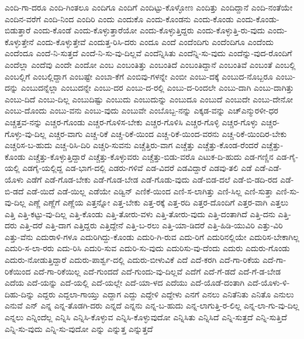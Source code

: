 {ಎಂದಿ-ಗಾ-ದರೂ
ಎಂದಿ-ಗಿಂತಲೂ
ಎಂದಿಗೂ
ಎಂದಿಗೆ
ಎಂದಿಟ್ಟು-ಕೊಳ್ಳೋಣ
ಎಂದಿತ್ತು
ಎಂದಿದ್ದಾನೆ
ಎಂದಿ-ನಂತೆಯೇ
ಎಂದಿನ-ವರೆಗೆ
ಎಂದಿ-ನಿಂದ
ಎಂದಿರಿ
ಎಂದು
ಎಂದುಕೊ
ಎಂದು-ಕೊಂಡನು
ಎಂದು-ಕೊಂಡು
ಎಂದು-ಕೊಂಡು-ಬಿಡುತ್ತಾರೆ
ಎಂದು-ಕೊಂಡೆ
ಎಂದು-ಕೊಳ್ಳುತ್ತಾರೆಯೋ
ಎಂದು-ಕೊಳ್ಳುತ್ತಿದ್ದರು
ಎಂದು-ಕೊಳ್ಳುತ್ತಿ-ರು-ವುದು
ಎಂದು-ಕೊಳ್ಳುತ್ತೇನೆ
ಎಂದು-ಕೊಳ್ಳುತ್ತೇವೆ
ಎಂದುತ್ತ-ರಿಸಿ-ದರು
ಎಂದೂ
ಎಂದೆ
ಎಂದೆಂದಿಗು
ಎಂದೆಂದಿಗೂ
ಎಂದೆಂದು
ಎಂದೆಂದೂ
ಎಂದೆ-ನಿ-ಸುತ್ತದೆ
ಎಂದೆ-ನಿ-ಸು-ವು-ದಿಲ್ಲವೆ
ಎಂದೆನ್ನಿಸಿತು
ಎಂದೆನ್ನಿ-ಸು-ವುದು
ಎಂದೆನ್ನು-ವುದ-ರೊಂದಿಗೆ
ಎಂದೆಲ್ಲಾ
ಎಂದೆವು
ಎಂದೇ
ಎಂದೋ
ಎಂಬ
ಎಂಬಂತಿತ್ತು
ಎಂಬಂತಿದೆ
ಎಂಬಂತಿದ್ದಾನೆ
ಎಂಬಂತಿವೆ
ಎಂಬಂತೆ
ಎಂಬಲ್ಲಿ
ಎಂಬಲ್ಲಿಗೆ
ಎಂಬಲ್ಲಿದ್ದಾಗ
ಎಂಬಷ್ಟೇ
ಎಂಬಾ-ಕೆಗೆ
ಎಂಬಿವು-ಗಳನ್ನೇ
ಎಂಬೀ
ಎಂಬು-ದಕ್ಕೆ
ಎಂಬುದ-ನೊಬ್ಬರೂ
ಎಂಬು-ದನ್ನು
ಎಂಬುದನ್ನೆಲ್ಲಾ
ಎಂಬುದನ್ನೇ
ಎಂಬು-ದರ
ಎಂಬು-ದ-ರಲ್ಲಿ
ಎಂಬು-ದ-ರಿಂದಲೇ
ಎಂಬು-ದಾಗಿ
ಎಂಬು-ದಾಗಿತ್ತು
ಎಂಬು-ದಿದೆ
ಎಂಬು-ದಿಲ್ಲ
ಎಂಬುದಿಷ್ಟು
ಎಂಬುದು
ಎಂಬುದುನ್ನು
ಎಂಬುದೂ
ಎಂಬುದೆ
ಎಂಬುದೇ
ಎಂಬು-ದೇನೋ
ಎಂಬು-ದೊಂದು
ಎಂಬು-ವನು
ಎಂಬು-ವುದು
ಎಂಬುವೇ
ಎಂಬೊಬ್ಬ-ನನ್ನು
ಎಕ್ಕಡ-ವನ್ನು
ಎಚ್ಎನ್ಮುರಳೀ-ಧರ
ಎಚ್ಚತ್ತವ-ನನ್ನು
ಎಚ್ಚರ-ಗೊಂಡು
ಎಚ್ಚರ-ಗೊಳಿಸ-ಬೇಕು
ಎಚ್ಚರ-ಗೊಳಿಸಿ
ಎಚ್ಚರ-ಗೊಳ್ಳಿ
ಎಚ್ಚರ-ಗೊಳ್ಳು
ಎಚ್ಚರ-ಗೊಳ್ಳು-ವು-ದಿಲ್ಲ
ಎಚ್ಚರ-ವಾಗು
ಎಚ್ಚ-ರಿಕೆ
ಎಚ್ಚ-ರಿಕೆ-ಯಿಂದ
ಎಚ್ಚ-ರಿಕೆ-ಯಿಂದ-ವರನು
ಎಚ್ಚ-ರಿಕೆ-ಯಿಂದಿರ-ಬೇಕು
ಎಚ್ಚರಿಸ-ಬ-ಹುದು
ಎಚ್ಚ-ರಿಸಿ-ದಿರಿ
ಎಚ್ಚರಿ-ಸುವನು
ಎಚ್ಚೆತ್ತಿರು-ವಾಗ
ಎಚ್ಚೆತ್ತು
ಎಚ್ಚೆತ್ತು-ಕೊಂಡ-ರೆಂದರೆ
ಎಚ್ಚೆತ್ತು-ಕೊಂಡು
ಎಚ್ಚೆತ್ತು-ಕೊಳ್ಳುತ್ತಿದ್ದಾರೆ
ಎಚ್ಚೆತ್ತು-ಕೊಳ್ಳುವರು
ಎಚ್ಚೆತ್ತು-ಬಿಡು-ವರೊ
ಎಟುಕ-ದಿ-ಹುದು
ಎಡ-ಗಣ್ಣಿನ
ಎಡ-ಗೈ-ಯಲ್ಲಿ
ಎಡಗೈ-ಯಲ್ಲಿದ್ದ
ಎಡ-ಭಾಗ-ದಲ್ಲಿ
ಎಡರು-ಗಳಿವೆ
ಎಡ-ವಿದರೆ
ಎಡವಿದ್ದಾರೆ
ಎಡವು-ತಲಿ
ಎಡೆ
ಎಡೆ-ಎಡೆ-ಯೊಳು
ಎಡೆಗೆ
ಎಡೆ-ಗೊಡ-ಬೇಕು
ಎಡೆ-ಗೊಡ-ಬೇಡ
ಎಡೆ-ಗೊಡು-ವುದು
ಎಡೆ-ಬಿಡ-ದಲೆ
ಎಡೆ-ಬಿ-ಡದಿ-ರದ
ಎಡೆ-ಬಿ-ಡದೆ
ಎಡೆ-ಯಿದೆ
ಎಡೆ-ಯಿಲ್ಲ
ಎಡೆಯೇ
ಎಡ್ವಿನ್
ಎಣಿಕೆ-ಯಿಂದ
ಎಣಿ-ಸ-ಲಾಗಿತ್ತು
ಎಣಿ-ಸಿಲ್ಲ
ಎಣಿ-ಸುತ್ತಾ
ಎಣಿ-ಸು-ವು-ದಿಲ್ಲ
ಎಣ್ಣೆ
ಎಣ್ಣೆಗೆ
ಎಣ್ಣೆಯ
ಎತ್ತನ್ನೋ
ಎತ್ತ-ಬೇಕು
ಎತ್ತ-ರಕ್ಕೆ
ಎತ್ತ-ರದಿ
ಎತ್ತರ-ದೊಂದಿಗೆ
ಎತ್ತರ-ವಾಗಿ
ಎತ್ತಲು
ಎತ್ತಿ
ಎತ್ತಿ-ಕಟ್ಟು-ವು-ದಿಲ್ಲ
ಎತ್ತಿ-ಕೊಂಡು
ಎತ್ತಿ-ತೋರು-ವಳು
ಎತ್ತಿ-ತೋರು-ವುದು
ಎತ್ತಿ-ದಂತಾಗಿದೆ
ಎತ್ತಿ-ದನು
ಎತ್ತಿ-ದರು
ಎತ್ತಿ-ದರೆ
ಎತ್ತಿ-ದಾಗ
ಎತ್ತಿದ್ದರು
ಎತ್ತಿದ್ದೇನೆ
ಎತ್ತಿ-ಬ-ರಲು
ಎತ್ತಿ-ಯಾ-ಡಿದರೆ
ಎತ್ತಿ-ಹಿಡಿ-ಯುವಿರಿ
ಎತ್ತು-ವಿರಿ
ಎತ್ತು-ವೆನು
ಎದುರಾಳಿ-ಗಳೂ
ಎದುರಿಗಿದ್ದು-ಕೊಂಡು
ಎದುರಿ-ಗಿ-ರುವ
ಎದು-ರಿಗೆ
ಎದುರಿನಲ್ಲಿಯೇ
ಎದುರಿಸ-ಬೇಕಾಗಿಲ್ಲ
ಎದುರಿ-ಸ-ಲಾ-ರರು
ಎದು-ರಿಸಿ
ಎದುರಿ-ಸುವ
ಎದುರಿ-ಸು-ವುದು
ಎದುರಿಸು-ವು-ದೆಂದು
ಎದುರು
ಎದುರು-ಗೊಂಡು
ಎದುರು-ನೋಡುತ್ತಿದ್ದಾರೆ
ಎದುರು-ಪಾರ್ಶ್ವ-ದಲ್ಲಿ
ಎದುರು-ಬೀಳುವಿಕೆ
ಎದೆ
ಎದೆ-ಕರಗಿ
ಎದೆ-ಗಾ-ರಿಕೆಯ
ಎದೆ-ಗಾ-ರಿಕೆಯಿಂದ
ಎದೆ-ಗಾ-ರಿಕೆಯಿಲ್ಲ
ಎದೆ-ಗುಂದದೆ
ಎದೆ-ಗುಂದು-ವು-ದಿಲ್ಲವೆ
ಎದೆಗೆ
ಎದೆ-ಗೆ-ಡದೆ
ಎದೆ-ಗೆ-ಡ-ಬೇಡ
ಎದೆಯ
ಎದೆ-ಯನ್ನು
ಎದೆ-ಯಲ್ಲಿ
ಎದೆ-ಯಲ್ಲೇ
ಎದೆ-ಯಾ-ಳದ
ಎದೆಯು
ಎದೆ-ಯೊಡೆ-ದಂತಾಗಿ
ಎದೆ-ಯೊಳು-ಳಿ-ದಿಹು-ದಿನ್ನು
ಎದ್ದರು
ಎದ್ದಲಾ-ಗಾಯ್ತು
ಎದ್ದಾಗ
ಎದ್ದು
ಎದ್ದೇಳಿ
ಎದ್ದೇಳು
ಎನಗೆ
ಎನಲು
ಎನಿತೆನಿತು
ಎನಿತೊ
ಎನುಲು
ಎನುವೆ
ಎನ್
ಎನ್ನ
ಎನ್ನ-ತೊಡಗಿ-ದರು
ಎನ್ನದೆ
ಎನ್ನನು
ಎನ್ನ-ಬ-ಹುದು
ಎನ್ನ-ಲಾಗುತ್ತಿ-ರ-ಲಿಲ್ಲ
ಎನ್ನ-ಲಾ-ಗು-ವು-ದಿಲ್ಲ
ಎನ್ನಲು
ಎನ್ನಿಂದೆಲ್ಲ
ಎನ್ನಿಸಿ
ಎನ್ನಿಸಿ-ಕೊಳ್ಳುವ
ಎನ್ನಿಸಿ-ಕೊಳ್ಳುವುದೋ
ಎನ್ನಿಸಿತು
ಎನ್ನಿಸಿದೆ
ಎನ್ನಿ-ಸುತ್ತದೆ
ಎನ್ನಿ-ಸುತ್ತಿದೆ
ಎನ್ನಿ-ಸು-ವುದು
ಎನ್ನಿ-ಸು-ವುದೋ
ಎನ್ನು
ಎನ್ನುತ್ತ
ಎನ್ನುತ್ತದೆ
}
